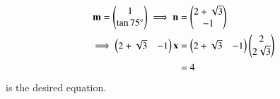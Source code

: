     \begin{align}
	    \mathbf{m} = \begin{pmatrix}1\\ \tan 75\degree\end{pmatrix}
	    \implies \mathbf{n} &= \begin{pmatrix}2+\sqrt{3}\\-1\end{pmatrix}
        \label{eq:11/10/2/4normal-vec}
	\\
	    \implies \begin{pmatrix}2+\sqrt{3} & -1\end{pmatrix}\mathbf{x} &=\begin{pmatrix}2+\sqrt{3}& -1\end{pmatrix}\begin{pmatrix}2\\2\sqrt{3}\end{pmatrix}  
	    \\
	    &= 4
        \label{eq:11/10/2/4line}
    \end{align}
is the desired equation. 

